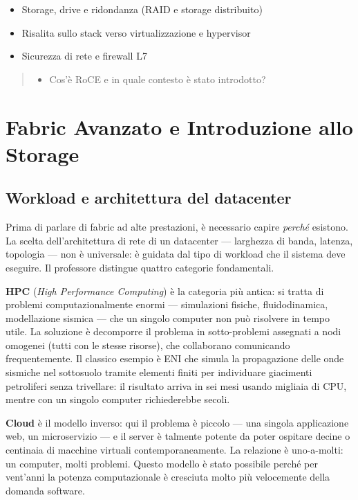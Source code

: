 \documentclass[
  italian,
  openany]{book}
\providecommand{\tightlist}{%
  \setlength{\itemsep}{0pt}\setlength{\parskip}{0pt}}
\begin{document}
\begin{itemize}
\tightlist
\item
  Storage, drive e ridondanza (RAID e storage distribuito)
\item
  Risalita sullo stack verso virtualizzazione e hypervisor
\item
  Sicurezza di rete e firewall L7
\end{itemize}

\begin{quote}
\begin{itemize}
\tightlist
\item
  Cos'è RoCE e in quale contesto è stato introdotto?
\end{itemize}
\end{quote}

\newpage

\chapter{Fabric Avanzato e Introduzione allo
Storage}\label{fabric-avanzato-e-introduzione-allo-storage}

\section{Workload e architettura del
datacenter}\label{workload-e-architettura-del-datacenter}

Prima di parlare di fabric ad alte prestazioni, è necessario capire
\emph{perché} esistono. La scelta dell'architettura di rete di un
datacenter --- larghezza di banda, latenza, topologia --- non è
universale: è guidata dal tipo di workload che il sistema deve eseguire.
Il professore distingue quattro categorie fondamentali.

\textbf{HPC} (\emph{High Performance Computing}) è la categoria più
antica: si tratta di problemi computazionalmente enormi --- simulazioni
fisiche, fluidodinamica, modellazione sismica --- che un singolo
computer non può risolvere in tempo utile. La soluzione è decomporre il
problema in sotto-problemi assegnati a nodi omogenei (tutti con le
stesse risorse), che collaborano comunicando frequentemente. Il classico
esempio è ENI che simula la propagazione delle onde sismiche nel
sottosuolo tramite elementi finiti per individuare giacimenti
petroliferi senza trivellare: il risultato arriva in sei mesi usando
migliaia di CPU, mentre con un singolo computer richiederebbe secoli.

\textbf{Cloud} è il modello inverso: qui il problema è piccolo --- una
singola applicazione web, un microservizio --- e il server è talmente
potente da poter ospitare decine o centinaia di macchine virtuali
contemporaneamente. La relazione è uno-a-molti: un computer, molti
problemi. Questo modello è stato possibile perché per vent'anni la
potenza computazionale è cresciuta molto più velocemente della domanda
software.
\end{document}
